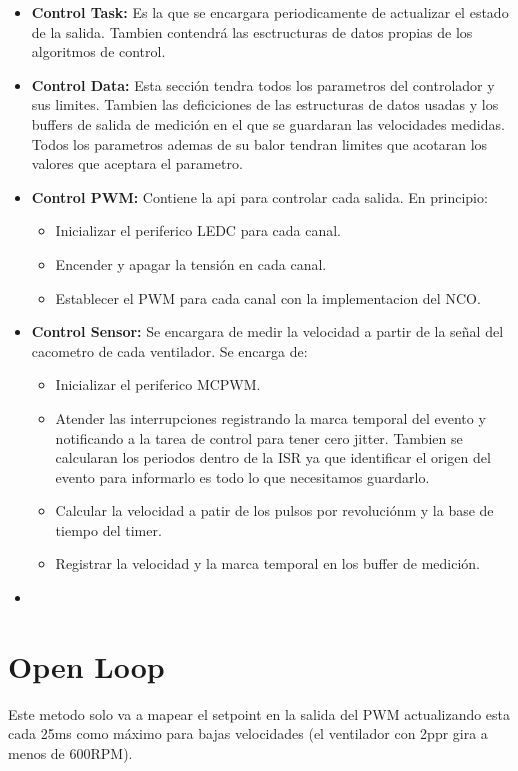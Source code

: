 \begin{itemize}
    \item \textbf{Control Task:} Es la que se encargara periodicamente de actualizar el estado de la salida. Tambien contendrá las esctructuras de datos propias de los algoritmos de control.
    \item \textbf{Control Data:} Esta sección tendra todos los parametros del controlador y sus limites. Tambien las deficiciones de las estructuras de datos usadas y los buffers de salida de medición en el que se guardaran las velocidades medidas. Todos los parametros ademas de su balor tendran limites que acotaran los valores que aceptara el parametro.
    \item \textbf{Control PWM:} Contiene la api para controlar cada salida. En principio:
    \begin{itemize}
        \item Inicializar el periferico LEDC para cada canal.
        \item Encender y apagar la tensión en cada canal. 
        \item Establecer el PWM para cada canal con la implementacion del NCO.
    \end{itemize}
    \item \textbf{Control Sensor:} Se encargara de medir la velocidad a partir de la señal del cacometro de cada ventilador. Se encarga de:
    \begin{itemize}
        \item Inicializar el periferico MCPWM.
        \item Atender las interrupciones registrando la marca temporal del evento y notificando a la tarea de control para tener cero jitter. Tambien se calcularan los periodos dentro de la ISR ya que identificar el origen del evento para informarlo es todo lo que necesitamos guardarlo.
        \item Calcular la velocidad a patir de los pulsos por revoluciónm y la base de tiempo del timer.
        \item Registrar la velocidad y la marca temporal en los buffer de medición.
    \end{itemize}
    \item 
\end{itemize}

\section{Open Loop}
Este metodo solo va a mapear el setpoint en la salida del PWM actualizando esta cada 25ms como máximo para bajas velocidades (el ventilador con 2ppr gira a menos de 600RPM).

